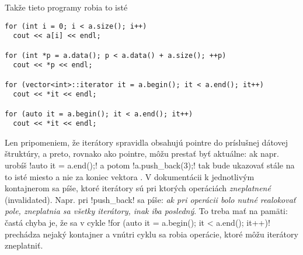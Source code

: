 \def\world(#1)#2#3{
  \draw[thick,#3](-1,-#1) -- (1.5,-#1) node[anchor=west]{\vb{#2}};
}

\def\kon(#1){ 
  \draw[draw=none] (0.2,-#1) rectangle node[align=center]{\vb{\ldots}} (1.2,1-#1);
}
  
\def\godot#1{\filldraw[blue,scale=0.6](#1) circle (0.4ex and 1.4ex);}


 Takže tieto programy robia to isté

\begin{lstlisting}
for (int i = 0; i < a.size(); i++) 
  cout << a[i] << endl;

for (int *p = a.data(); p < a.data() + a.size(); ++p) 
  cout << *p << endl;

for (vector<int>::iterator it = a.begin(); it < a.end(); it++)
  cout << *it << endl;

for (auto it = a.begin(); it < a.end(); it++)
  cout << *it << endl;
\end{lstlisting}

Len pripomeniem, že iterátory spravidla obsahujú pointre do príslušnej dátovej štruktúry, 
a preto, rovnako ako pointre, môžu prestať byť aktuálne:
ak napr. urobíš \prg!auto it = a.end();! a potom \prg!a.push_back(3);! tak
 bude ukazovať stále na to isté miesto a nie za koniec vektora .
V dokumentácii k jednotlivým kontajnerom sa píše, ktoré iterátory sú pri ktorých operáciách
{\em zneplatnené} (invalidated). Napr. pri \prg!push_back! sa píše: {\em ak pri operácii
bolo nutné realokovať pole, zneplatnia sa všetky iterátory, inak iba posledný}.
To treba mať na pamäti: častá chyba je, že sa v cykle 
\prg!for (auto it = a.begin(); it < a.end(); it++)! prechádza nejaký kontajner
a vnútri cyklu sa robia operácie, ktoré môžu iterátory zneplatniť. 

